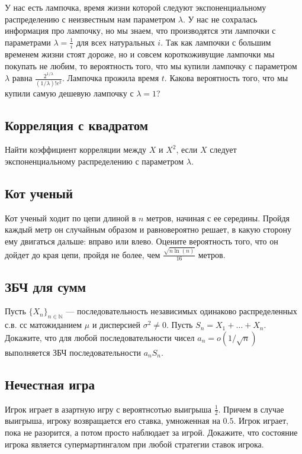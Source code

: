 \documentclass[12pt]{article}
\newcommand\N{\mathbb{N}}
\begin{document}
У нас есть лампочка, время жизни которой следуют экспоненциальному распределению с неизвестным нам параметром $\lambda$. У нас не сохралась информация про лампочку, но мы знаем, что производятся эти лампочки с параметрами $\lambda = \frac{1}{i}$ для всех натуральных $i$. Так как лампочки с большим временем жизни стоят дороже, но и совсем короткоживущие лампочки мы покупать не любим, то вероятность того, что мы купили лампочку с параметром $\lambda$ равна $\frac{2^{1/\lambda}}{(1/\lambda)!e^2}$. Лампочка прожила время $t$. Какова вероятность того, что мы купили самую дешевую лампочку с $\lambda = 1$?




\subsection{Корреляция с квадратом}

Найти коэффициент корреляции между $X$ и $X^2$, если $X$ следует экспоненциальному распределению с параметром $\lambda$.



\subsection{Кот ученый}

Кот ученый ходит по цепи длиной в $n$ метров, начиная с ее середины. Пройдя каждый метр он случайным образом и равновероятно решает, в какую сторону ему двигаться дальше: вправо или влево. Оцените вероятность того, что он дойдет до края цепи, пройдя не более, чем $\frac{\sqrt{n \ln(n)}}{16}$ метров.



\subsection{ЗБЧ для сумм}
Пусть $\{X_n\}_{n \in \N}$ --- последовательность независимых одинаково распределенных с.в. сс матожиданием $\mu$ и дисперсией $\sigma^2 \ne 0$. Пусть $S_n = X_1 + \dots + X_n$. Докажите, что для любой последовательности чисел $a_n = o(1/\sqrt{n})$ выполняется ЗБЧ последовательности $a_n S_n$.



\subsection{Нечестная игра}

Игрок играет в азартную игру с вероятнсотью выигрыша $\frac{1}{2}$. Причем в случае выигрыша, игроку возвращается его ставка, умноженная на $0.5$. Игрок играет, пока не разорится, а потом просто наблюдает за игрой. Докажите, что состояние игрока является супермартингалом при любой стратегии ставок игрока.
\end{document}
